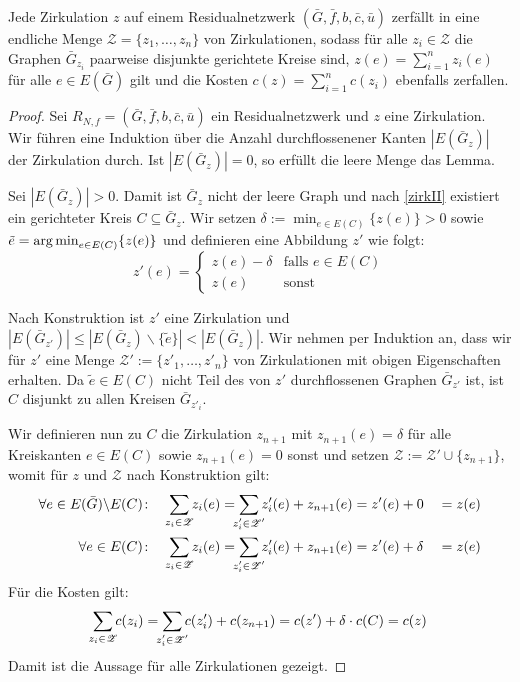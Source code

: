 \begin{lem}\label{zerl}Jede Zirkulation $z$ auf einem Residualnetzwerk $(\bar{G},\bar{f},b,\bar{c},\bar{u})$ zerfällt in eine endliche Menge $\mathscr{Z}=\{z_1,\ldots,z_n\}$ von Zirkulationen, sodass für alle $z_i\in\mathscr{Z}$ die Graphen $\bar{G}_{z_i}$ paarweise disjunkte gerichtete Kreise sind, $z(e)=\sum_{i=1}^{n} z_i(e)$ für alle $e\in E(\bar{G})$ gilt und die Kosten $c(z)=\sum_{i=1}^{n} c(z_i)$ ebenfalls zerfallen.\end{lem}
\begin{proof}Sei $R_{N,f}= (\bar{G},\bar{f},b,\bar{c},\bar{u})$ ein Residualnetzwerk und $z$ eine Zirkulation. Wir führen eine Induktion über die Anzahl durchflossenener Kanten $|E(\bar{G}_z)|$ der Zirkulation durch. Ist $|E(\bar{G}_z)|=0$, so erfüllt die leere Menge das Lemma.
    
Sei $|E(\bar{G}_z)|>0$. Damit ist $\bar{G}_z$ nicht der leere Graph und nach \cref{zirkII} existiert ein gerichteter Kreis $C\subseteq \bar{G}_z$. Wir setzen $\delta:=\min_{e\in E(C)} \{z(e)\}>0$ sowie $\tilde{e}=\operatorname*{arg\,min}_{e\in E(C)} \{z(e)\}$ und definieren eine Abbildung $z'$ wie folgt:
\begin{equation*}z'(e)=\begin{cases}
z(e)-\delta&\text{falls }e\in E(C)\\
z(e)&\text{sonst}\end{cases}
\end{equation*}

Nach Konstruktion ist $z'$ eine Zirkulation und $|E(\bar{G}_{z'})|\leq|E(\bar{G}_z)\backslash\{\tilde{e}\}|<|E(\bar{G}_z)|$. Wir nehmen per Induktion an, dass wir für $z'$ eine Menge $\mathscr{Z}':=\{z'_1,\ldots,z'_n\}$ von Zirkulationen mit obigen Eigenschaften erhalten. Da $\tilde{e}\in E(C)$ nicht Teil des von $z'$ durchflossenen Graphen $\bar{G}_{z'}$ ist, ist $C$ disjunkt zu allen Kreisen $\bar{G}_{z'_i}$.

Wir definieren nun zu $C$ die Zirkulation $z_{n+1}$ mit $z_{n+1}(e)=\delta$ für alle Kreiskanten $e\in E(C)$ sowie $z_{n+1}(e)=0$ sonst und setzen $\mathscr{Z}:=\mathscr{Z}'\cup \{z_{n+1}\}$, womit für $z$ und $\mathscr{Z}$ nach Konstruktion gilt:
\begin{alignat*}{2}
\forall e\in E(\bar{G})\backslash E(C)\colon\quad &\sum_{\mathclap{z_i\in\mathscr{Z}}} z_i(e) = \sum_{\mathclap{z'_i\in\mathscr{Z'}}} z'_i(e) + z_{n+1}(e)
=z'(e) + 0 &&= z (e)\\
%
\forall e\in E(C)\colon\quad &\sum_{\mathclap{z_i\in\mathscr{Z}}} z_i(e) = \sum_{\mathclap{z'_i\in\mathscr{Z'}}} z'_i(e) + z_{n+1}(e)
= z'(e) + \delta &&= z(e)
\end{alignat*}
Für die Kosten gilt:
\begin{equation*}
\sum_{\mathclap{z_i\in\mathscr{Z}}} c(z_i) = \sum_{\mathclap{z'_i\in\mathscr{Z'}}} c(z'_i) + c(z_{n+1}) = c(z') + \delta\cdot c(C) = c(z)
\end{equation*}
Damit ist die Aussage für alle Zirkulationen gezeigt.\end{proof}

